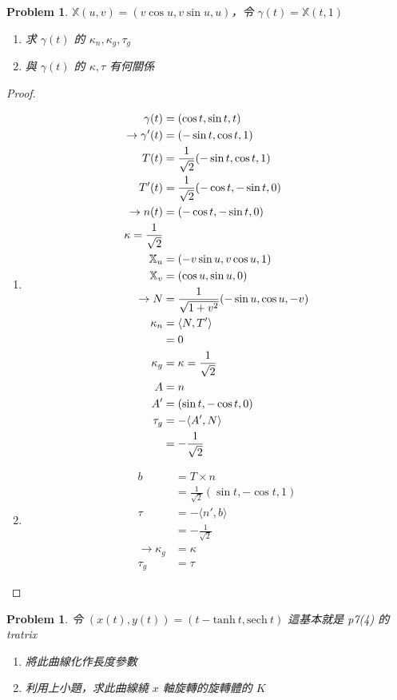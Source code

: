 \documentclass[10pt,a4paper]{article}
\newcounter{theProblemCounter}
\newtheorem{problem}[theProblemCounter]{Problem}
\begin{document}
\setcounter{theProblemCounter}{4}
\begin{problem}
$\mathbb{X}(u, v) = (v\cos u, v\sin u, u)$，令 $\gamma(t)=\mathbb{X}(t, 1)$
\begin{enumerate}[{ (}a{)}]
\item 求 $\gamma(t)$ 的 $\kappa_n, \kappa_g, \tau_g$
\item 與 $\gamma(t)$ 的 $\kappa, \tau$ 有何關係
\end{enumerate}
\end{problem}
\begin{proof}
\begin{enumerate}[{ (}a{)}]
\item
\begin{align*}
\gamma(t)&=(\cos t, \sin t, t)\\
\rightarrow \gamma'(t)&=(-\sin t,\cos t,1)\\
T(t)&=\frac{1}{\sqrt2}(-\sin t,\cos t,1)\\
T'(t)&=\frac{1}{\sqrt2}(-\cos t,-\sin t,0)\\
\rightarrow n(t)&=(-\cos t,-\sin t,0)\\
\kappa = \frac{1}{\sqrt2}\\
\mathbb{X}_u&=(-v\sin u,v\cos u,1)\\
\mathbb{X}_v&=(\cos u,\sin u,0)\\
\rightarrow N&=\frac{1}{\sqrt{1+v^2}}(-\sin u, \cos u,-v)\\
\kappa_n&=\langle N,T'\rangle\\
&=0\\
\kappa_g&=\kappa = \frac{1}{\sqrt2}\\
A&=n\\
A'&=(\sin t,-\cos t,0)\\
\tau_g&=-\langle A',N\rangle\\
&=-\frac{1}{\sqrt2}
\end{align*}
\item
\begin{align*}
b&=T\times n\\
&=\frac{1}{\sqrt2}(\sin t,-\cos t, 1)\\
\tau&=-\langle n', b\rangle\\
&=-\frac{1}{\sqrt2}\\
\rightarrow \kappa_g&=\kappa\\
\tau_g &= \tau
\end{align*}
\end{enumerate}
\end{proof}
\newpage
\setcounter{theProblemCounter}{5}
\begin{problem}
令 $(x(t), y(t)) = (t-\mathrm{tanh\ } t, \mathrm{sech\ } t)$ 這基本就是 p7(4) 的 tratrix
\begin{enumerate}[{ (}a{)}]
\item 將此曲線化作長度參數
\item 利用上小題，求此曲線繞 $x$ 軸旋轉的旋轉體的 $K$
\end{enumerate}
\end{problem}
\end{document}
